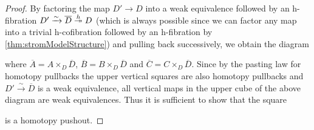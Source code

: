 \begin{prop}
\begin{proof}
        By factoring the map $D'\to D$ into a weak equivalence followed by an h-fibration $D'\xrightarrow{\sim}\overline{D}\xtwoheadrightarrow{h} D$ (which is always possible since we can factor any map into a trivial h-cofibration followed by an h-fibration by \cref{thm:stromModelStructure}) and pulling back successively, we obtain the diagram
        \begin{center}
        \end{center}
        where $\overline{A}=A\times_{D}\overline{D}$, $\overline{B}=B\times_{D}\overline{D}$ and $\overline{C}=C\times_{D}\overline{D}$.
        Since by the pasting law for homotopy pullbacks the upper vertical squares are also homotopy pullbacks and $D'\xrightarrow{\sim}\overline{D}$ is a weak equivalence, all vertical maps in the upper cube of the above diagram are weak equivalences.
        Thus it is sufficient to show that the square
        \begin{center}
        \end{center}
        is a homotopy pushout.


\end{proof}
\end{prop}

